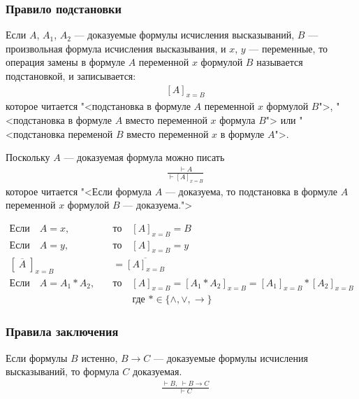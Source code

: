 \documentclass[fleqn,11pt]{article}
\newcommand{\NOT}[1]{\overline{#1}}
\theoremstyle{definition}
\begin{document}
\subsubsection{Правило подстановки}
Если $A$, $A_1$, $A_2$ \cdash--- доказуемые формулы исчисления высказываний, $B$ \cdash--- произвольная
формула исчисления высказывания, и $x$, $y$ \cdash--- переменные, то операция замены в формуле $A$
переменной $x$ формулой $B$ называется подстановкой, и записывается:
\begin{align}
	& \left[A \right]_{x=B}
\end{align}
которое читается "<подстановка в формуле $A$ переменной $x$ формулой $B$">,
"<подстановка в формуле $A$ вместо переменной $x$ формула $B$"> или
"<подстановка переменой $B$ вместо переменной $x$ в формуле $A$">.

Поскольку $A$ \cdash--- доказуемая формула можно писать
\begin{align}
	& \frac{\vdash A}{\vdash \left[A \right]_{x=B}}
\end{align}
которое читается "<Если формула $A$ \cdash--- доказуема, то подстановка в формуле $A$ переменной
$x$ формулой $B$ \cdash--- доказуема.">

\begin{align}
	\text{Если} \quad A = x, \quad &\text{то} \quad \left[A\right]_{x=B} = B \\
	\text{Если} \quad A = y,\quad &\text{то} \quad \left[A\right]_{x=B} = y \\
	\left[\;\NOT{A}\;\right]_{x=B} &= \NOT{\left[A\right]_{x=B}} \\
	\text{Если} \quad A = A_1 \ast A_2, \quad &\text{то} \quad \left[A\right]_{x=B} = \left[A_1 \ast A_2\right]_{x=B}
	  = \left[A_1\right]_{x=B} \ast \left[A_2\right]_{x=B} \\
		 & \qquad \text{где $\ast \in \{\land, \lor, \rightarrow\}$}
\end{align}

\subsubsection{Правила заключения}
Если формулы $B$ истенно, $B \rightarrow C$ \cdash--- доказуемые формулы исчисления высказываний, то формула $C$
доказуемая.
\begin{align}
	& \frac{\vdash B, \; \vdash B \rightarrow C}{\vdash C}
\end{align}
\end{document}

